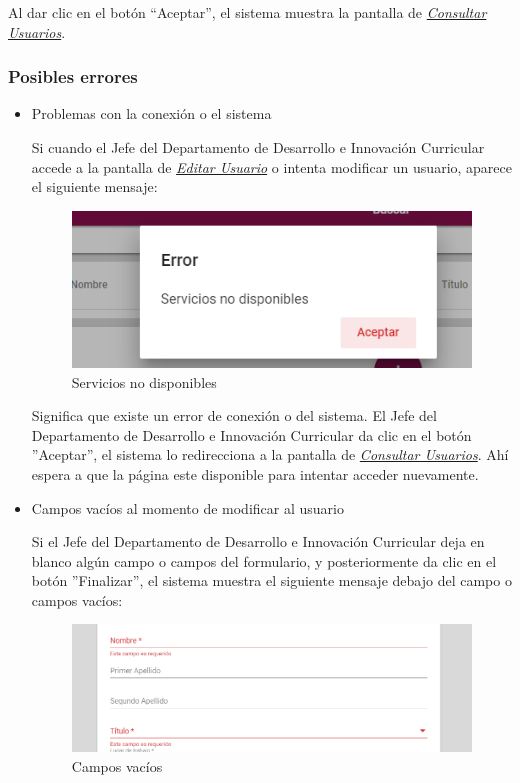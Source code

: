 Al dar clic en el botón “Aceptar”, el sistema muestra la pantalla de \hyperlink{consultarUs-JDDIC}{\textit{Consultar Usuarios}}.

\subsubsection{Posibles errores}
\begin{itemize}
	\item Problemas con la conexión o el sistema
	
	Si cuando el Jefe del Departamento de Desarrollo e Innovación Curricular accede a la pantalla de \hyperlink{editarUs-JDDIC}{\textit{Editar Usuario}} o intenta modificar un usuario, aparece el siguiente mensaje:
	\clearpage
	\begin{figure}[H]
		\centering
		\includegraphics[width=0.4\linewidth]{images/SP5/MSGSN}
		\caption{Servicios no disponibles}
		
	\end{figure}
	
	
	Significa que existe un error de conexión o del sistema. El Jefe del Departamento de Desarrollo e Innovación Curricular da clic en el botón ''Aceptar'', el sistema lo redirecciona  a la pantalla de \hyperlink{consultarUs-JDDIC}{\textit{Consultar Usuarios}}. Ahí  espera a que la página este disponible para intentar acceder nuevamente.
	
	\item Campos vacíos al momento de modificar al usuario
	
	Si el Jefe del Departamento de Desarrollo e Innovación Curricular deja en blanco algún campo o campos del formulario, y posteriormente da clic en el botón ''Finalizar'', el sistema muestra el siguiente mensaje debajo del campo o campos vacíos:
	
	\begin{figure}[H]
		\centering
		\includegraphics[width=0.4\linewidth]{images/SP5/MSG44}
		\caption{Campos vacíos}
		\label{mensaje44-JDDIC}
		

\end{figure}
\end{itemize}
